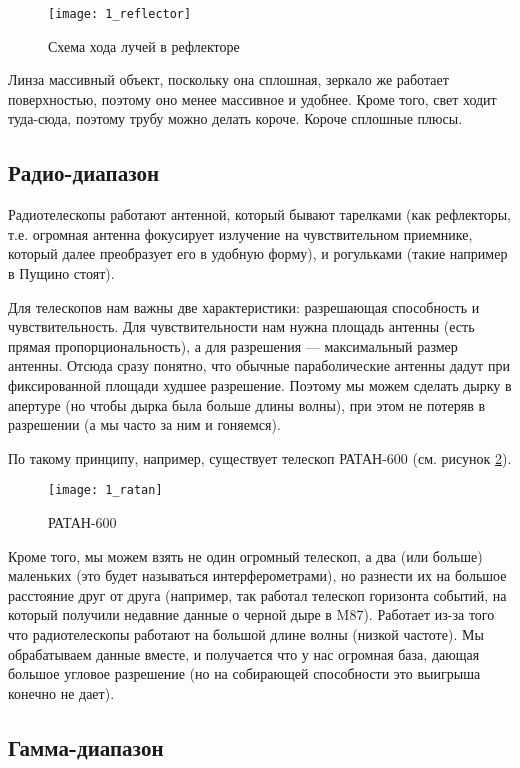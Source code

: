 \begin{figure}[H]
	\centering
	\texttt{[image: 1\_reflector]}
	\caption{Схема хода лучей в рефлекторе}
	\label{fig:1_reflector}
\end{figure}

Линза массивный объект, поскольку она сплошная, зеркало же работает поверхностью, поэтому оно менее массивное и удобнее. Кроме того, свет ходит туда-сюда, поэтому трубу можно делать короче. Короче сплошные плюсы.

\subsection{Радио-диапазон}

Радиотелескопы работают антенной, который бывают тарелками (как рефлекторы, т.е. огромная антенна фокусирует излучение на чувствительном приемнике, который далее преобразует его в удобную форму), и рогульками (такие например в Пущино стоят).

Для телескопов нам важны две характеристики: разрешающая способность и чувствительность. Для чувствительности нам нужна площадь антенны (есть прямая пропорциональность), а для разрешения --- максимальный размер антенны. Отсюда сразу понятно, что обычные параболические антенны дадут при фиксированной площади худшее разрешение. Поэтому мы можем сделать дырку в апертуре (но чтобы дырка была больше длины волны), при этом не потеряв в разрешении (а мы часто за ним и гоняемся).

По такому принципу, например, существует телескоп РАТАН-600 (см. рисунок \ref{fig:1_ratan}).

\begin{figure}[H]
	\centering
	\texttt{[image: 1\_ratan]}
	\caption{РАТАН-600}
	\label{fig:1_ratan}
\end{figure}

Кроме того, мы можем взять не один огромный телескоп, а два (или больше) маленьких (это будет называться интерферометрами), но разнести их на большое расстояние друг от друга (например, так работал телескоп горизонта событий, на который получили недавние данные о черной дыре в M87). Работает из-за того что радиотелескопы работают на большой длине волны (низкой частоте). Мы обрабатываем данные вместе, и получается что у нас огромная база, дающая большое угловое разрешение (но на собирающей способности это выигрыша конечно не дает).

\subsection{Гамма-диапазон}

